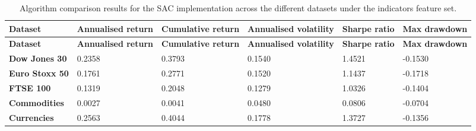 \begin{longtable}{|l|p{2.1cm}|p{2.1cm}|p{2.1cm}|p{1.5cm}|p{2cm}|}
    \caption{Algorithm comparison results for the SAC implementation across the different datasets under the indicators feature set.}
    \label{tab:experiment_algorithms_sac}
    \\ 
    \hline
    \textbf{Dataset} & \textbf{Annualised return} & \textbf{Cumulative return} & \textbf{Annualised volatility} & \textbf{Sharpe ratio} & \textbf{Max drawdown}  \\ \midrule
    \endfirsthead

    \hline
    \textbf{Dataset} & \textbf{Annualised return} & \textbf{Cumulative return} & \textbf{Annualised volatility} & \textbf{Sharpe ratio} & \textbf{Max drawdown}  \\ \midrule
    \endhead

    \endfoot
    \hline

    \textbf{Dow Jones 30} & 0.2358 & 0.3793 & 0.1540 & 1.4521 & -0.1530 \\ \hline
    \textbf{Euro Stoxx 50} & 0.1761 & 0.2771 & 0.1520 & 1.1437 & -0.1718 \\ \hline
    \textbf{FTSE 100} & 0.1319 & 0.2048 & 0.1279 & 1.0326 & -0.1404 \\ \hline
    \textbf{Commodities} & 0.0027 & 0.0041 & 0.0480 & 0.0806 & -0.0704 \\ \hline
    \textbf{Currencies} & 0.2563 & 0.4044 & 0.1778 & 1.3727 & -0.1356 \\ \hline
\end{longtable}